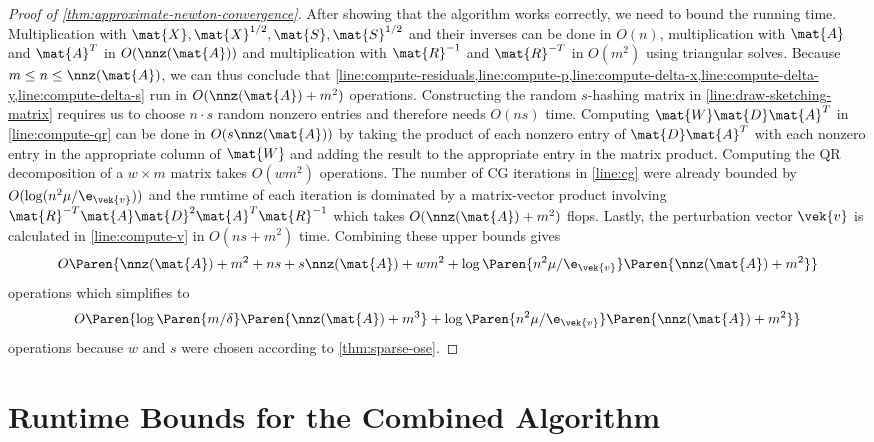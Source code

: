 \begin{proof}[Proof of \cref{thm:approximate-newton-convergence}]
  After showing that the algorithm works correctly, we need to bound the running time.
  Multiplication with \(\mat{X}, \mat{X}^{1/2}, \mat{S}, \mat{S}^{1/2}\) and their inverses can be done in \(O(n)\), multiplication with \(\mat{A}\) and \(\mat{A}^T\) in \(O(\nnz(\mat{A}))\) and multiplication with \(\mat{R}^{-1}\) and \(\mat{R}^{-T}\) in \(O(m^2)\) using triangular solves.
  Because \(m \leq n \leq \nnz(\mat{A})\), we can thus conclude that \cref{line:compute-residuals,line:compute-p,line:compute-delta-x,line:compute-delta-y,line:compute-delta-s} run in \(O(\nnz(\mat{A}) + m^2)\) operations.
  Constructing the random \(s\)-hashing matrix in \cref{line:draw-sketching-matrix} requires us to choose \(n \cdot s\) random nonzero entries and therefore needs \(O(n s)\) time.
  Computing \(\mat{W}\mat{D}\mat{A}^T\) in \cref{line:compute-qr} can be done in \(O(s \nnz(\mat{A}))\) by taking the product of each nonzero entry of \(\mat{D}\mat{A}^T\) with each nonzero entry in the appropriate column of \(\mat{W}\) and adding the result to the appropriate entry in the matrix product.
  Computing the QR decomposition of a \(w \times m\) matrix takes \(O(w m^2)\) operations.
  The number of CG iterations in \cref{line:cg} were already bounded by \(O(\log(n^2 \mu / \e_{\vek{v}}))\) and the runtime of each iteration is dominated by a matrix-vector product involving \(\mat{R}^{-T}\mat{A}\mat{D}^2\mat{A}^T\mat{R}^{-1}\) which takes \(O(\nnz(\mat{A}) + m^2)\) flops.
  Lastly, the perturbation vector \(\vek{v}\) is calculated in \cref{line:compute-v} in \(O(ns + m^2)\) time.
  Combining these upper bounds gives
  \[ O \Paren{\nnz(\mat{A}) + m^2 + ns + s \nnz(\mat{A}) + wm^2 + \log \Paren{n^2 \mu / \e_{\vek{v}}} \Paren{\nnz(\mat{A}) + m^2}} \]
  operations which simplifies to
  \[ O \Paren{\log \Paren{m/\delta} \Paren{\nnz(\mat{A}) + m^3} + \log \Paren{n^2 \mu / \e_{\vek{v}}} \Paren{\nnz(\mat{A}) + m^2}} \]
  operations because \(w\) and \(s\) were chosen according to \cref{thm:sparse-ose}.
\end{proof}


\section{Runtime Bounds for the Combined Algorithm}

